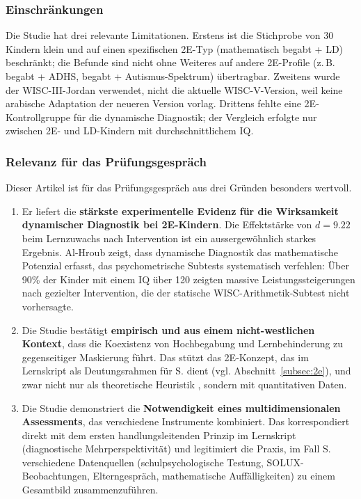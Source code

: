 \documentclass[ngerman, a4paper]{article}
\begin{document}
\subsubsection*{Einschränkungen}

Die Studie hat drei relevante Limitationen. Erstens ist die Stichprobe von
30 Kindern klein und auf einen spezifischen 2E-Typ (mathematisch begabt +
LD) beschränkt; die Befunde sind nicht ohne Weiteres auf andere 2E-Profile
(z.\,B. begabt + ADHS, begabt + Autismus-Spektrum) übertragbar. Zweitens
wurde der WISC-III-Jordan verwendet, nicht die aktuelle WISC-V-Version,
weil keine arabische Adaptation der neueren Version vorlag. Drittens fehlte
eine 2E-Kontrollgruppe für die dynamische Diagnostik; der Vergleich
erfolgte nur zwischen 2E- und LD-Kindern mit durchschnittlichem IQ.

\subsubsection*{Relevanz für das Prüfungsgespräch}

Dieser Artikel ist für das Prüfungsgespräch aus drei Gründen besonders
wertvoll.

\begin{enumerate}
  \item Er liefert die \textbf{stärkste experimentelle Evidenz für die
    Wirksamkeit dynamischer Diagnostik bei 2E-Kindern}. Die Effektstärke
    von $d = 9.22$ beim Lernzuwachs nach Intervention ist ein
    aussergewöhnlich starkes Ergebnis. Al-Hroub zeigt, dass dynamische
    Diagnostik das mathematische Potenzial erfasst, das psychometrische
    Subtests systematisch verfehlen: Über 90\% der Kinder mit einem IQ
    über 120 zeigten massive Leistungssteigerungen nach gezielter
    Intervention, die der statische WISC-Arithmetik-Subtest nicht
    vorhersagte.
  \item Die Studie bestätigt \textbf{empirisch und aus einem
    nicht-westlichen Kontext}, dass die Koexistenz von Hochbegabung und
    Lernbehinderung zu gegenseitiger Maskierung führt. Das stützt das
    2E-Konzept, das im Lernskript als Deutungsrahmen für S. dient
    (vgl. Abschnitt~\ref{subsec:2e}), und zwar nicht nur als theoretische
    Heuristik \parencite{webb2020doppeldiagnosen}, sondern mit
    quantitativen Daten.
  \item Die Studie demonstriert die \textbf{Notwendigkeit eines
    multidimensionalen Assessments}, das verschiedene Instrumente
    kombiniert. Das korrespondiert direkt mit dem ersten
    handlungsleitenden Prinzip im Lernskript (diagnostische
    Mehrperspektivität) und legitimiert die Praxis, im Fall S.
    verschiedene Datenquellen (schulpsychologische Testung,
    SOLUX-Beobachtungen, Elterngespräch, mathematische Auffälligkeiten)
    zu einem Gesamtbild zusammenzuführen.
\end{enumerate}
\end{document}
